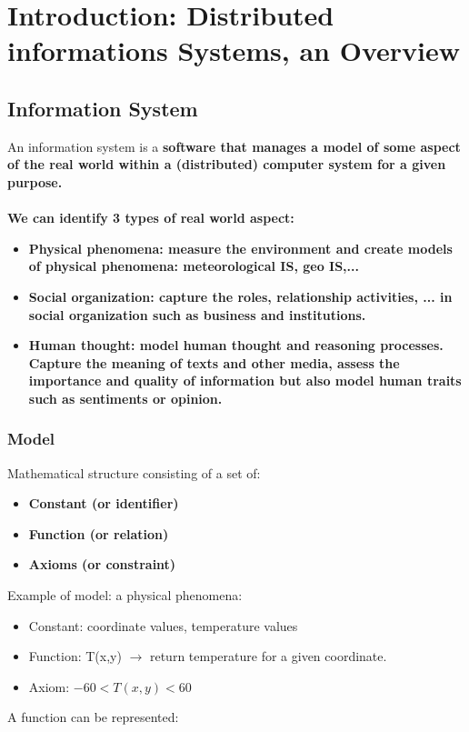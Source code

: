 
\section{Introduction: Distributed informations Systems, an Overview}


\subsection{Information System}

An information system is a \bf{software} that manages a \bf{model} of some aspect of the \bf{real world} within a (distributed) computer system for a given \bf{purpose}.
\\
\\
We can identify 3 types of real world aspect:
\begin{itemize}
	\item \bf{Physical phenomena:} measure the environment and create models of physical phenomena: meteorological IS, geo IS,...
	\item \bf{Social organization:} capture the roles, relationship activities, ... in social organization such as business and institutions.
	\item \bf{Human thought:} model human thought and reasoning processes. Capture the meaning of texts and other media, assess the importance and quality of information but also model human traits such as sentiments or opinion.
\end{itemize}

\subsubsection{Model}
Mathematical structure consisting of a set of:
\begin{itemize}
\item \bf{Constant} (or identifier)
\item \bf{Function} (or relation)
\item \bf{Axioms} (or constraint)
\end{itemize}
Example of model: a physical phenomena:

\begin{itemize}
\item Constant: coordinate values, temperature values
\item Function: T(x,y) $\rightarrow$ return temperature for a given coordinate.
\item Axiom: $-60 < T(x,y) < 60$
\end{itemize}
A function can be represented:


